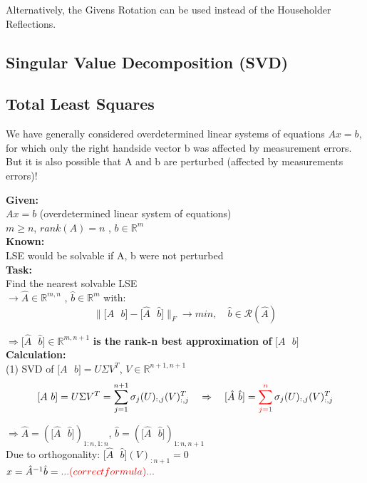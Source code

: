 \documentclass[12pt, a4paper]{article}
\newcommand{\R}{\mathbb{R}}
\begin{document}
Alternatively, the Givens Rotation can be used instead of the Householder Reflections. 
 
\subsection{Singular Value Decomposition (SVD)}




\subsection{Total Least Squares}
We have generally considered overdetermined linear systems of equations $Ax = b$, for which only the right handside vector b was affected by measurement errors. But it is also possible that A and b are perturbed (affected by measurements errors)!

\begin{tcolorbox}
\textbf{Given:}\\
$Ax = b$ (overdetermined linear system of equations) \\
$m \geq n$, $rank(A)=n$ ,  $b \in \R^{m}$\vspace{2mm}\\
\textbf{Known:}  \\
LSE would be solvable if A, b were not perturbed  \vspace{2mm}\\
\textbf{Task:} \\
Find the nearest solvable LSE \\
$\rightarrow  \hat A \in \R^{m,n}$ ,  $\hat b \in \R^{m}$ with: \\
\[ \lVert \lbrack A \text{ }b \rbrack - \lbrack \hat A \text{ } \hat b \rbrack\rVert_{F} \rightarrow min, \quad \hat b \in \mathcal{R}(\hat A) \] 
\end{tcolorbox}


$\Rightarrow \lbrack \hat A \text{ } \hat b \rbrack \in \R^{m, n+1}$ \textbf{is the rank-n best approximation of}  $\lbrack A \text{ }b \rbrack$ \\

\textbf{Calculation:} \\
(1) SVD of $\lbrack A \text{ }b \rbrack = U \Sigma V^{T}$, \quad \quad $V \in \R^{n+1, n+1}$ \\
\[ \lbrack A \text{ }b \rbrack =  U \Sigma V^{T} = \sum_{j=1}^{n+1} \sigma_j (U)_{:,j} (V)_{:,j}^{T} \quad \Rightarrow \quad  \lbrack \hat A \text{ } \hat b \rbrack = \color{red}\sum_{j=1}^{n} \color{black}\sigma_j (U)_{:,j} (V)_{:,j}^{T} \]
\begin{center}
$\Rightarrow \hat A = (\lbrack \hat A \text{ } \hat b \rbrack )_{1:n, 1:n}$, \quad $\hat b = (\lbrack \hat A \text{ } \hat b \rbrack )_{1:n, n+1}$ \vspace{2mm}\\
	Due to orthogonality: $\lbrack \hat A \text{ } \hat b \rbrack (V)_{:n+1} = 0$
	\vspace{10mm}\\

	$x = \hat A^{-1} \hat b =\color{red} ... (correct formula)...$
 
\end{center}
\end{document}
